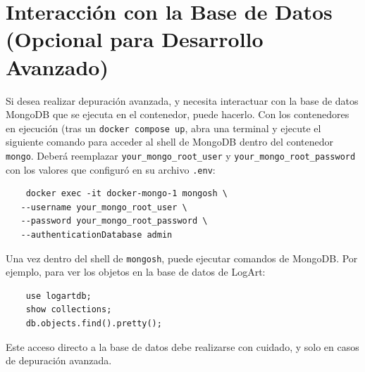 \section{Interacción con la Base de Datos (Opcional para Desarrollo Avanzado)}
\label{appA:interaccionBD}
Si desea realizar depuración avanzada, y necesita interactuar con la base de datos MongoDB que se ejecuta en el contenedor, puede hacerlo. Con los contenedores en ejecución (tras un \texttt{docker compose up}, abra una terminal y ejecute el siguiente comando para acceder al shell de MongoDB dentro del contenedor \texttt{mongo}. Deberá reemplazar \texttt{your\_mongo\_root\_user} y \texttt{your\_mongo\_root\_password} con los valores que configuró en su archivo \texttt{.env}:
\begin{verbatim}
    docker exec -it docker-mongo-1 mongosh \
   --username your_mongo_root_user \
   --password your_mongo_root_password \
   --authenticationDatabase admin
\end{verbatim}
Una vez dentro del shell de \texttt{mongosh}, puede ejecutar comandos de MongoDB. Por ejemplo, para ver los objetos en la base de datos de LogArt:
\begin{verbatim}
    use logartdb;
    show collections;
    db.objects.find().pretty();
\end{verbatim}
Este acceso directo a la base de datos debe realizarse con cuidado, y solo en casos de depuración avanzada.